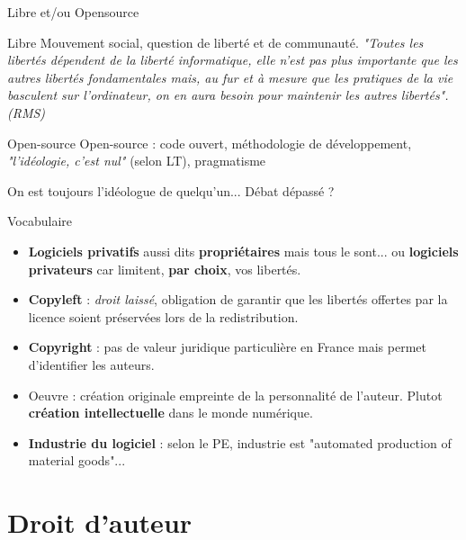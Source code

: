 \documentclass{beamer}
\begin{document}
\begin{frame}{Libre et/ou Opensource}

  \begin{block}{Libre}
    Mouvement social, question de liberté et de communauté. \textit{"Toutes les libertés dépendent de la liberté informatique, elle n’est pas plus importante que les autres libertés fondamentales mais, au fur et à mesure que les pratiques de la vie basculent sur l’ordinateur, on en aura besoin pour maintenir les autres libertés". (RMS)}
  \end{block}

  \begin{block}{Open-source}
    Open-source : code ouvert, méthodologie de développement, \textit{"l'idéologie, c'est nul"} (selon LT), pragmatisme
  \end{block}

On est toujours l'idéologue de quelqu'un... Débat dépassé ?
\end{frame}

\begin{frame}{Vocabulaire}

  \begin{itemize}
  \item \textbf{Logiciels privatifs} aussi dits \textbf{propriétaires} mais tous le sont... ou \textbf{logiciels privateurs} car limitent, \textbf{par choix}, vos libertés.
  \item \textbf{Copyleft} : \textit{droit laissé}, obligation de garantir que les libertés offertes par la licence soient préservées lors de la redistribution.
  \item \textbf{Copyright} : pas de valeur juridique particulière en France mais permet d'identifier les auteurs.
  \item Oeuvre : création originale empreinte de la personnalité de l'auteur. Plutot \textbf{création intellectuelle} dans le monde numérique.
  \item \textbf{Industrie du logiciel} : selon le PE, industrie est "automated production of material goods"...
  \end{itemize}
\end{frame}

\section{Droit d'auteur}
\end{document}
